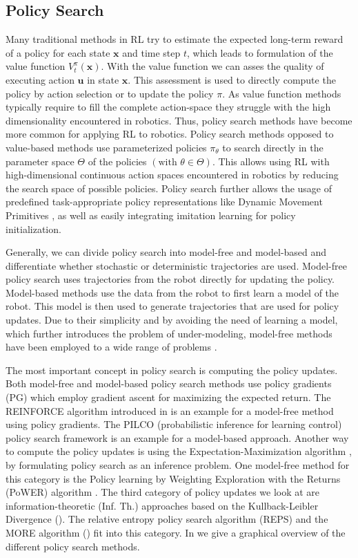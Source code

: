 \subsection{Policy Search}
Many traditional methods in RL try to estimate the
expected long-term reward of a policy for each state $\mathbf{x}$
and time step $t$, which leads to formulation of the value
function $V^{\pi}_t(\mathbf{x})$.
With the value function we can asses the quality of executing action
$\mathbf{u}$ in state $\mathbf{x}$. This assessment is used
to directly compute the policy by action selection or to update
the policy $\pi$. As value function methods typically require
to fill the complete action-space they struggle with
the high dimensionality encountered in robotics.
Thus, policy search methods have become more common
for applying RL to robotics.
Policy search methods opposed to value-based methods
use parameterized policies $\pi_{\theta}$ to search
directly in the parameter space $\Theta$
of the policies $(\text{with }\theta \in \Theta)$. This allows using RL with
high-dimensional continuous action spaces encountered
in robotics by reducing the search space of possible policies.
Policy search further allows the usage of predefined
task-appropriate policy representations like Dynamic
Movement Primitives \citep{schaal2005learning}, as well
as easily integrating imitation learning
for policy initialization.

Generally, we can divide policy search into model-free and model-based and
differentiate whether stochastic or deterministic trajectories are used.
Model-free policy search uses trajectories from the robot directly
for updating the policy. Model-based methods use the data
from the robot to first learn a model of the robot. This model is then used
to generate trajectories that are used for policy updates.
Due to their simplicity and by avoiding the need of learning a model,
which further introduces the problem of under-modeling,
model-free methods have been employed to a wide range of problems
\citep{deisenroth2013survey}.

The most important concept in policy search is computing the policy updates.
Both model-free and model-based policy search methods use policy
gradients (PG) which employ gradient ascent for maximizing
the expected return.
The REINFORCE algorithm introduced in \citet{williams1992simple}
is an example for a model-free method using policy gradients.
The PILCO (probabilistic inference for learning control)
policy search framework \citep{deisenroth2011pilco}
is an example for a model-based approach.
Another way to compute the policy updates 
is using the Expectation-Maximization algorithm \citep{bishop2006pattern},
by formulating policy
search as an inference problem. One model-free method for this category
is the Policy learning by Weighting Exploration with the Returns (PoWER)
algorithm \citep{kober2011policy}.
The third category of policy updates we look at
are information-theoretic (Inf. Th.) approaches
based on the Kullback-Leibler Divergence ().
The relative entropy policy search algorithm (REPS)
\citep{peters2010relative}
and the MORE algorithm () fit into this category.
In 
we give a graphical overview of the different policy search methods.

